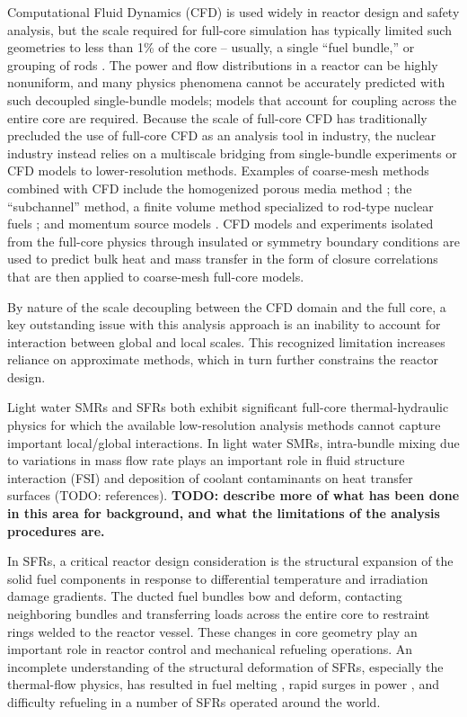 \documentclass[11pt,letterpaper,english]{article}
\begin{document}
Computational Fluid Dynamics (CFD) is used widely in reactor design and safety analysis, but the scale required for full-core simulation has typically limited such geometries to less than 1\% of the core -- usually, a single ``fuel bundle,'' or grouping of rods \cite{wang2020,fanning,wang2020b}. The power and flow distributions in a reactor can be highly nonuniform, and many physics phenomena cannot be accurately predicted with such decoupled single-bundle models; models that account for coupling across the entire core are required. Because the scale of full-core CFD has traditionally precluded the use of full-core CFD as an analysis tool in industry, the nuclear industry instead relies on a multiscale bridging from single-bundle experiments or CFD models to lower-resolution methods. Examples of coarse-mesh methods combined with CFD include the homogenized porous media method \cite{wang2020c}; the ``subchannel'' method, a finite volume method specialized to rod-type nuclear fuels \cite{blyth}; and momentum source models \cite{hu2013}. CFD models and experiments isolated from the full-core physics through insulated or symmetry boundary conditions are used to predict bulk heat and mass transfer in the form of closure correlations that are then applied to coarse-mesh full-core models.

By nature of the scale decoupling between the CFD domain and the full core, a key outstanding issue with this analysis approach is an inability to account for interaction between global and local scales. This recognized limitation increases reliance on approximate methods, which in turn further constrains the reactor design.

Light water SMRs and SFRs both exhibit significant full-core thermal-hydraulic physics for which the available low-resolution analysis methods cannot capture important local/global interactions. In light water SMRs, intra-bundle mixing due to variations in mass flow rate plays an important role in fluid structure interaction (FSI) and deposition of coolant contaminants on heat transfer surfaces (TODO: references). {\bf TODO: describe more of what has been done in this area for background, and what the limitations of the analysis procedures are.}

In SFRs, a critical reactor design consideration is the structural expansion of the solid fuel components in response to differential temperature and irradiation damage gradients. The ducted fuel bundles bow and deform, contacting neighboring bundles and transferring loads across the entire core to restraint rings welded to the reactor vessel. These changes in core geometry play an important role in reactor control and mechanical refueling operations. An incomplete understanding of the structural deformation of SFRs, especially the thermal-flow physics, has resulted in fuel melting \cite{brittan}, rapid surges in power \cite{chaumont}, and difficulty refueling \cite{shields} in a number of SFRs operated around the world.
\end{document}
